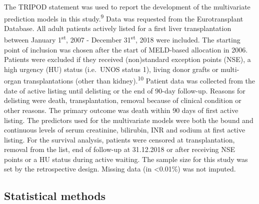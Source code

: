 \documentclass[11pt,english,]{book} %
\begin{document}
The TRIPOD statement was used to report the development of the multivariate prediction models in this study.\textsuperscript{9} Data was requested from the Eurotransplant Database. All adult patients actively listed for a first liver transplantation between January 1\textsuperscript{st}, 2007 - December 31\textsuperscript{st}, 2018 were included. The starting point of inclusion was chosen after the start of MELD-based allocation in 2006. Patients were excluded if they received (non)standard exception points (NSE), a high urgency (HU) status (i.e.~UNOS status 1), living donor grafts or multi-organ transplantations (other than kidney).\textsuperscript{10} Patient data was collected from the date of active listing until delisting or the end of 90-day follow-up. Reasons for delisting were death, transplantation, removal because of clinical condition or other reasons. The primary outcome was death within 90 days of first active listing. The predictors used for the multivariate models were both the bound and continuous levels of serum creatinine, bilirubin, INR and sodium at first active listing. For the survival analysis, patients were censored at transplantation, removal from the list, end of follow-up at 31.12.2018 or after receiving NSE points or a HU status during active waiting. The sample size for this study was set by the retrospective design. Missing data (in \textless0.01\%) was not imputed.

\hypertarget{statistical-methods}{%
\subsection*{Statistical methods}\label{statistical-methods}}
\end{document}
